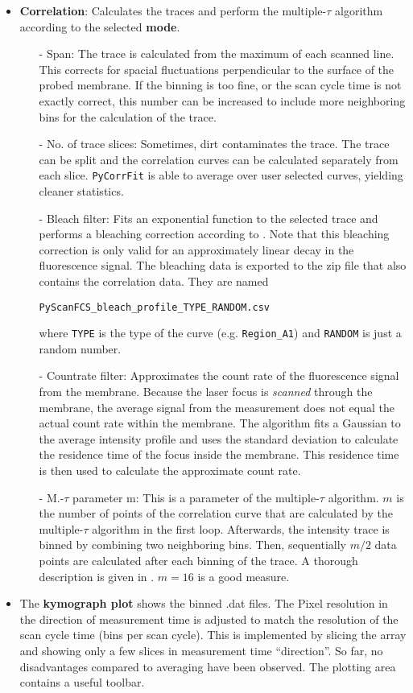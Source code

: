 \begin{itemize}
\item \textbf{Correlation}: Calculates the traces and perform the multiple-$\tau$ algorithm according to the selected \textbf{mode}. 
	\begin{itemize}
	\item[-] Span: The trace is calculated from the maximum of each scanned line. This corrects for spacial fluctuations perpendicular to the surface of the probed membrane. If the binning is too fine, or the scan cycle time is not exactly correct, this number can be increased to include more neighboring bins for the calculation of the trace.
	\item[-] No. of trace slices: Sometimes, dirt contaminates the trace. The trace can be split and the correlation curves can be calculated separately from each slice. \texttt{PyCorrFit} is able to average over user selected curves, yielding cleaner statistics.
	\item[-] Bleach filter: Fits an exponential function to the selected trace and performs a bleaching correction according to \cite{Ries2009}. Note that this bleaching correction is only valid for an approximately linear decay in the fluorescence signal. The bleaching data is exported to the zip file that also contains the correlation data. They are named
	\begin{center}
	\texttt{PyScanFCS\_bleach\_profile\_TYPE\_RANDOM.csv}
	\end{center}
	where  \texttt{TYPE} is the type of the curve (e.g. \texttt{Region\_A1}) and \texttt{RANDOM} is just a random number.
	\item[-] Countrate filter: Approximates the count rate of the fluorescence signal from the membrane. Because the laser focus is \textit{scanned} through the membrane, the average signal from the measurement does not equal the actual count rate within the membrane. The algorithm fits a Gaussian to the average intensity profile and uses the standard deviation to calculate the residence time of the focus inside the membrane.	This residence time is then used to calculate the approximate count rate.
	\item[-] M.-$\tau$ parameter m: This is a parameter of the multiple-$\tau$ algorithm. $m$ is the number of points of the correlation curve that are calculated by the multiple-$\tau$ algorithm in the first loop. Afterwards, the intensity trace is binned by combining two neighboring bins. Then, sequentially $m/2$ data points are calculated after each binning of the trace. A thorough description is given in \cite{Wohland2001}. $m=16$ is a good measure.

	\end{itemize}
\item The \textbf{kymograph plot} shows the binned \mytilde .dat files. The Pixel resolution in the direction of measurement time is adjusted to match the resolution of the scan cycle time (bins per scan cycle). This is implemented by slicing the array and showing only a few slices in measurement time ``direction''. So far, no disadvantages compared to averaging have been observed. The plotting area contains a useful toolbar.
\end{itemize}

